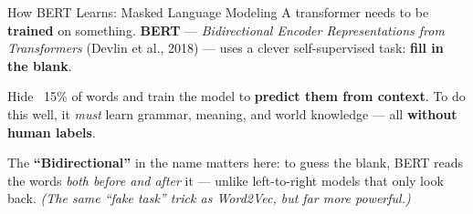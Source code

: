 \documentclass[aspectratio=169]{beamer}
\begin{document}
\begin{frame}{How BERT Learns: Masked Language Modeling}
\vspace{0.2cm}
{\small A transformer needs to be \textbf{trained} on something. \textbf{BERT}
--- \textit{Bidirectional Encoder Representations from Transformers} (Devlin et al., 2018) ---
uses a clever self-supervised task: \textbf{fill in the blank}.}

\medskip
\begin{center}
\end{center}

\medskip
{\small Hide ~15\% of words and train the model to \textbf{predict them from context}. To do
this well, it \emph{must} learn grammar, meaning, and world knowledge --- all \textbf{without
human labels}.}

\smallskip
{\small The \textbf{``Bidirectional''} in the name matters here: to guess the blank, BERT reads
the words \emph{both before and after} it --- unlike left-to-right models that only look back.
\textcolor{midgray}{\textit{(The same ``fake task'' trick as Word2Vec, but far more powerful.)}}}
\end{frame}
\end{document}
